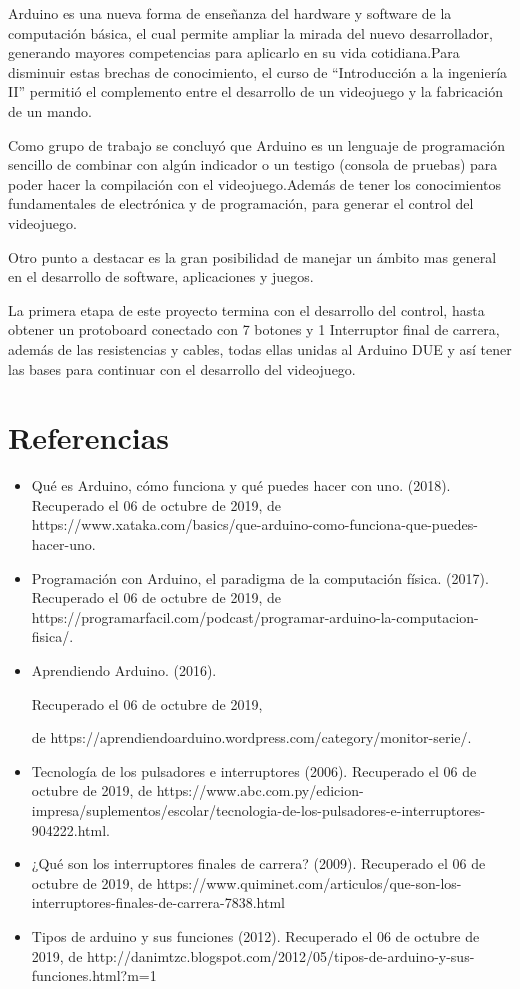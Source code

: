 \documentclass[12pt]{article}
\begin{document}
Arduino es una nueva forma de enseñanza del hardware y software de la computación básica, el cual permite ampliar la mirada del nuevo desarrollador, generando mayores competencias para aplicarlo en su vida cotidiana.Para disminuir estas brechas de conocimiento, el curso de “Introducción a la ingeniería II” permitió el complemento entre el desarrollo de un videojuego y la fabricación de un mando.

 Como grupo de trabajo se concluyó que Arduino es un lenguaje de programación sencillo de combinar con algún indicador o un testigo (consola de pruebas) para poder hacer la compilación con el videojuego.Además de tener los conocimientos fundamentales de electrónica y de programación, para generar el control del videojuego.
 
Otro punto a destacar es la gran posibilidad de manejar un ámbito mas general en el desarrollo de software, aplicaciones y juegos.

La primera etapa de este proyecto termina con el desarrollo del control, hasta obtener un protoboard conectado con 7 botones y 1 Interruptor final de carrera, además de las resistencias y cables, todas ellas unidas al Arduino DUE y así tener las bases para continuar con el desarrollo del videojuego.

\newpage
\section{ Referencias}
    \begin{itemize}
    \item Qué es Arduino, cómo funciona y qué puedes hacer con uno. (2018).
    Recuperado el 06 de octubre de 2019, de https://www.xataka.com/basics/que-arduino-como-funciona-que-puedes-hacer-uno. 
    
    \item Programación con Arduino, el paradigma de la computación física. (2017). 
    Recuperado el 06 de octubre de 2019, de https://programarfacil.com/podcast/programar-arduino-la-computacion-fisica/.
    
     \item Aprendiendo Arduino. (2016).
     
     Recuperado el 06 de octubre de 2019,
     
     de https://aprendiendoarduino.wordpress.com/category/monitor-serie/.
     
     \item Tecnología de los pulsadores e interruptores (2006). Recuperado el 06 de octubre de 2019, de https://www.abc.com.py/edicion-impresa/suplementos/escolar/tecnologia-de-los-pulsadores-e-interruptores-904222.html.
     
    \item ¿Qué son los interruptores finales de carrera? (2009). 
    Recuperado el 06 de octubre de 2019, de https://www.quiminet.com/articulos/que-son-los-interruptores-finales-de-carrera-7838.html
    
    \item Tipos de arduino y sus funciones (2012). Recuperado el 06 de octubre de 2019, de http://danimtzc.blogspot.com/2012/05/tipos-de-arduino-y-sus-funciones.html?m=1
    
    \end{itemize}
\end{document}
